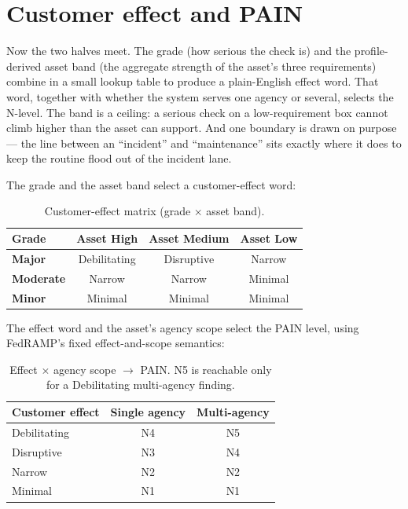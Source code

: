 \documentclass[11pt]{article}
\begin{document}
\section{Customer effect and PAIN}
\label{sec:pain}
\begin{plain}
Now the two halves meet. The grade (how serious the check is) and the
profile-derived asset band (the aggregate strength of the asset's three
requirements) combine in a small lookup table to produce a plain-English effect
word. That word, together with whether the system serves one agency or several,
selects the N-level. The band is a ceiling: a serious check on a low-requirement box
cannot climb higher than the asset can support. And one boundary is drawn on
purpose --- the line between an ``incident'' and ``maintenance'' sits exactly where
it does to keep the routine flood out of the incident lane.
\end{plain}

The grade and the asset band select a customer-effect word:

\begin{table}[H]
\centering
\renewcommand{\arraystretch}{1.3}
\begin{tabular}{l ccc}
\toprule
\textbf{Grade} & \textbf{Asset High} & \textbf{Asset Medium} & \textbf{Asset Low} \\
\midrule
\textbf{Major}    & \cellcolor{crit!20}Debilitating & \cellcolor{high!25}Disruptive & \cellcolor{med!30}Narrow \\
\textbf{Moderate} & \cellcolor{med!30}Narrow         & \cellcolor{med!30}Narrow      & \cellcolor{low!25}Minimal \\
\textbf{Minor}    & \cellcolor{low!25}Minimal        & \cellcolor{low!25}Minimal     & \cellcolor{low!25}Minimal \\
\bottomrule
\end{tabular}
\caption{Customer-effect matrix (grade $\times$ asset band).}
\label{tab:effect}
\end{table}

The effect word and the asset's agency scope select the PAIN level, using FedRAMP's
fixed effect-and-scope semantics:

\begin{table}[H]
\centering
\renewcommand{\arraystretch}{1.3}
\begin{tabular}{l cc}
\toprule
\textbf{Customer effect} & \textbf{Single agency} & \textbf{Multi-agency} \\
\midrule
Debilitating & N4 & \cellcolor{crit!20}N5 \\
Disruptive   & N3 & \cellcolor{high!25}N4 \\
Narrow       & N2 & N2 \\
Minimal      & N1 & N1 \\
\bottomrule
\end{tabular}
\caption{Effect $\times$ agency scope $\rightarrow$ PAIN. N5 is reachable only for a
Debilitating multi-agency finding.}
\label{tab:paintbl}
\end{table}
\end{document}
